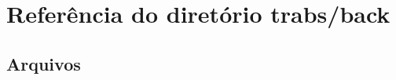 \section{Referência do diretório trabs/back}
\label{dir_98e90b719cd37504edd99e30107b6d62}
\subsection*{Arquivos}
\begin{DoxyCompactItemize}
\end{DoxyCompactItemize}
